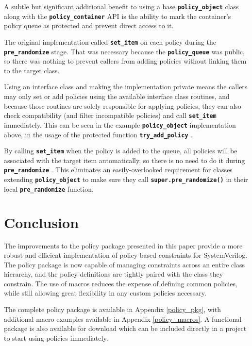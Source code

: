 \documentclass[conference,onecolumn]{IEEEtran}
\newcommand{\code}[1]{
\textbf{\texttt{#1}}
}
\begin{document}
A subtle but significant additional benefit to using a base \code{policy_object} class along with the \code{policy_container} API is the ability to mark the container's policy queue as protected and prevent direct access to it. 

The original implementation called \code{set_item} on each policy during the \code{pre_randomize} stage. That was necessary because the \code{policy_queue} was public, so there was nothing to prevent callers from adding policies without linking them to the target class.

Using an interface class and making the implementation private means the callers may only set or add policies using the available interface class routines, and because those routines are solely responsible for applying policies, they can also check compatibility (and filter incompatible policies) and call \code{set_item} immediately. This can be seen in the example \code{policy_object} implementation above, in the usage of the protected function \code{try_add_policy}.

By calling \code{set_item} when the policy is added to the queue, all policies will be associated with the target item automatically, so there is no need to do it during \code{pre_randomize}. This eliminates an easily-overlooked requirement for classes extending \code{policy_object} to make sure they call \code{super.pre_randomize()} in their local \code{pre_randomize} function.

\section{Conclusion}

The improvements to the policy package presented in this paper provide a more robust and efficient implementation of policy-based constraints for SystemVerilog. The policy package is now capable of managing constraints across an entire class hierarchy, and the policy definitions are tightly paired with the class they constrain. The use of macros reduces the expense of defining common policies, while still allowing great flexibility in any custom policies necessary.

The complete policy package is available in Appendix \ref{policy_pkg}, with additional macro examples available in Appendix \ref{policy_macros}. A functional package is also available for download \cite{b6} which can be included directly in a project to start using policies immediately.
\end{document}
